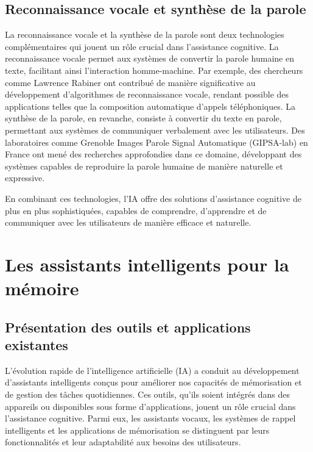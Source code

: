 \documentclass[12pt,a4paper]{report}
\begin{document}
\subsection{Reconnaissance vocale et synthèse de la parole}

La reconnaissance vocale et la synthèse de la parole sont deux technologies complémentaires qui jouent un rôle crucial dans l'assistance cognitive. La reconnaissance vocale permet aux systèmes de convertir la parole humaine en texte, facilitant ainsi l'interaction homme-machine. Par exemple, des chercheurs comme Lawrence Rabiner ont contribué de manière significative au développement d'algorithmes de reconnaissance vocale, rendant possible des applications telles que la composition automatique d'appels téléphoniques. La synthèse de la parole, en revanche, consiste à convertir du texte en parole, permettant aux systèmes de communiquer verbalement avec les utilisateurs. Des laboratoires comme Grenoble Images Parole Signal Automatique (GIPSA-lab) en France ont mené des recherches approfondies dans ce domaine, développant des systèmes capables de reproduire la parole humaine de manière naturelle et expressive.

En combinant ces technologies, l'IA offre des solutions d'assistance cognitive de plus en plus sophistiquées, capables de comprendre, d'apprendre et de communiquer avec les utilisateurs de manière efficace et naturelle.


\section{Les assistants intelligents pour la mémoire}

\subsection{Présentation des outils et applications existantes}

L'évolution rapide de l'intelligence artificielle (IA) a conduit au développement d'assistants intelligents conçus pour améliorer nos capacités de mémorisation et de gestion des tâches quotidiennes. Ces outils, qu'ils soient intégrés dans des appareils ou disponibles sous forme d'applications, jouent un rôle crucial dans l'assistance cognitive. Parmi eux, les assistants vocaux, les systèmes de rappel intelligents et les applications de mémorisation se distinguent par leurs fonctionnalités et leur adaptabilité aux besoins des utilisateurs.
\end{document}

